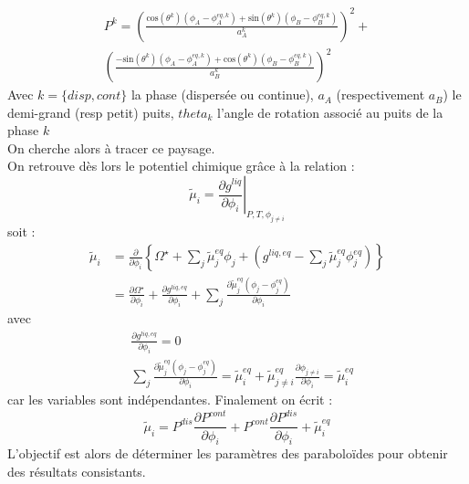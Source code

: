 \documentclass[a4paper,11pt,fleqn]{report}    %
\newcommand{\co}[1]{\text{cos}\left(#1\right)}
\newcommand{\sinus}[1]{\text{sin}\left(#1\right)}
\begin{document}
\begin{multline}
	P^{k}=\left(\frac{\co{\theta^{k}}(\phi_{A}-\phi_{A}^{eq,k}) + \sinus{\theta^{k}}(\phi_{B}-\phi_{B}^{eq,k})}{a_{A}^{k}}\right)^{2}+\\ \left(\frac{-\sinus{\theta^{k}}(\phi_{A}-\phi_{A}^{eq,k}) + \co{\theta^{k}}(\phi_{B}-\phi_{B}^{eq,k})}{a_{B}^{k}}\right)^{2}
	\label{eq:paraboloid_general_}
\end{multline} 
Avec $k = \{disp,cont\}$ la phase (dispersée ou continue), $a_A$ (respectivement $a_B$) le demi-grand (resp petit) puits, $theta_k$ l'angle de rotation associé au puits de la phase $k$\\
On cherche alors à tracer ce paysage. \\
On retrouve dès lors le potentiel chimique grâce à la relation :
\begin{equation}\label{calul_potentiel}
	\tilde{\mu}_i = \left.\frac{\partial g^{liq}}{\partial \phi_i}\right|_{P,T,\phi_{j\neq i}} 
\end{equation}
soit : 
\begin{align*}
	\tilde{\mu}_i &= \frac{\partial}{\partial \phi_i}\left\lbrace 
	\Omega^{\star} + \sum_j \tilde{\mu}_j^{eq}\phi_j + \left( {g}^{liq,eq} -  \sum_j \tilde{\mu}_j^{eq}\phi_j^{eq} \right)\right\rbrace \\
	&= \frac{\partial \Omega^{\star}}{\partial \phi_i} + \frac{\partial g^{liq,eq}}{\partial \phi_i} + \sum_j \frac{\partial \tilde{\mu}_j^{eq}\left(\phi_j - \phi_j^{eq}\right)}{\partial  \phi_i}
\end{align*}
avec 
\begin{align*}
	& \frac{\partial g^{liq,eq}}{\partial \phi_i} = 0 \\
		& \sum_j \frac{\partial \tilde{\mu}_j^{eq}\left(\phi_j - \phi_j^{eq}\right)}{\partial  \phi_i} = \tilde{\mu}_i^{eq} +\tilde{\mu}_{j\neq i}^{eq} \frac{\partial \phi_{j\neq i}}{\partial \phi_i} = \tilde{\mu}_i^{eq}
\end{align*}
car les variables sont indépendantes. Finalement on écrit :
\begin{equation}
\tilde{\mu}_i =	P^{dis}\frac{\partial P^{cont}}{\partial \phi_i} + P^{cont}\frac{\partial P^{dis}}{\partial \phi_i} + \tilde{\mu}_i^{eq}
\end{equation}
L'objectif est alors de déterminer les paramètres des paraboloïdes pour obtenir des résultats consistants.
\end{document}
